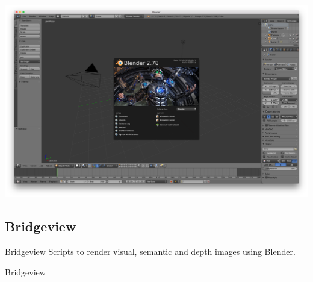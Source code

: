 \documentclass{beamer}
\begin{document}
\begin{frame}[plain]
  \includegraphics[width=\textwidth]{blender.png}
\end{frame}

\subsection{Bridgeview}

\begin{frame}{Bridgeview}
  Scripts to render visual, semantic and depth images using
  Blender.
  
  
\end{frame}

\begin{frame}{Bridgeview}
  
\end{frame}
\end{document}

